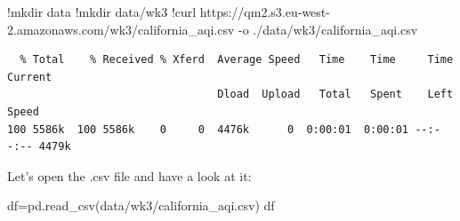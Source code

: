 \documentclass[
  letterpaper,
  DIV=11,
  numbers=noendperiod]{scrreprt}
\newenvironment{Shaded}{\begin{snugshade}}{\end{snugshade}}
\newcommand{\ErrorTok}[1]{\textcolor[rgb]{0.68,0.00,0.00}{#1}}
\newcommand{\FloatTok}[1]{\textcolor[rgb]{0.68,0.00,0.00}{#1}}
\newcommand{\NormalTok}[1]{\textcolor[rgb]{0.00,0.23,0.31}{#1}}
\newcommand{\OperatorTok}[1]{\textcolor[rgb]{0.37,0.37,0.37}{#1}}
\newcommand{\StringTok}[1]{\textcolor[rgb]{0.13,0.47,0.30}{#1}}
\begin{document}
\begin{Shaded}
\begin{Highlighting}[]
\OperatorTok{!}\NormalTok{mkdir data}
\OperatorTok{!}\NormalTok{mkdir data}\OperatorTok{/}\NormalTok{wk3}
\OperatorTok{!}\NormalTok{curl https:}\OperatorTok{//}\NormalTok{qm2.s3.eu}\OperatorTok{{-}}\NormalTok{west}\OperatorTok{{-}}\FloatTok{2.}\ErrorTok{amazonaws}\NormalTok{.com}\OperatorTok{/}\NormalTok{wk3}\OperatorTok{/}\NormalTok{california\_aqi.csv }\OperatorTok{{-}}\NormalTok{o .}\OperatorTok{/}\NormalTok{data}\OperatorTok{/}\NormalTok{wk3}\OperatorTok{/}\NormalTok{california\_aqi.csv}
\end{Highlighting}
\end{Shaded}

\begin{verbatim}
  % Total    % Received % Xferd  Average Speed   Time    Time     Time  Current
                                 Dload  Upload   Total   Spent    Left  Speed
100 5586k  100 5586k    0     0  4476k      0  0:00:01  0:00:01 --:--:-- 4479k
\end{verbatim}

Let's open the .csv file and have a look at it:

\begin{Shaded}
\begin{Highlighting}[]
\NormalTok{df}\OperatorTok{=}\NormalTok{pd.read\_csv(}\StringTok{\textquotesingle{}data/wk3/california\_aqi.csv\textquotesingle{}}\NormalTok{)}
\NormalTok{df}
\end{Highlighting}
\end{Shaded}
\end{document}
